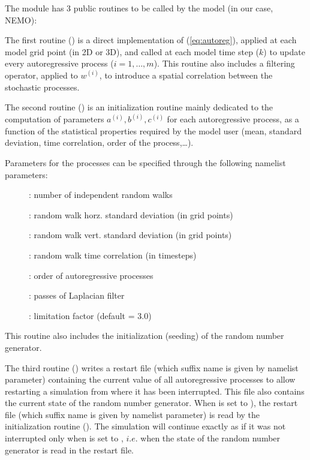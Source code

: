 \documentclass[../tex_main/NEMO_manual]{subfiles}
\begin{document}
The  module has 3 public routines to be called by the model (in our case, NEMO):

The first routine () is a direct implementation of (\autoref{eq:autoreg}),
applied at each model grid point (in 2D or 3D), 
and called at each model time step ($k$) to update
every autoregressive process ($i=1,\ldots,m$).
This routine also includes a filtering operator, applied to $w^{(i)}$,
to introduce a spatial correlation between the stochastic processes.

The second routine () is an initialization routine mainly dedicated
to the computation of parameters $a^{(i)}, b^{(i)}, c^{(i)}$
for each autoregressive process, as a function of the statistical properties
required by the model user (mean, standard deviation, time correlation,
order of the process,\ldots). 

Parameters for the processes can be specified through the following  namelist parameters:
\begin{description}
   \item[]   : number of independent random walks 
   \item[] : random walk horz. standard deviation (in grid points)
   \item[]  : random walk vert. standard deviation (in grid points)
   \item[]  : random walk time correlation (in timesteps)
   \item[]   : order of autoregressive processes
   \item[]   : passes of Laplacian filter
   \item[]   : limitation factor (default = 3.0)
\end{description}
This routine also includes the initialization (seeding) of the random number generator.

The third routine () writes a restart file (which suffix name is 
given by  namelist parameter) containing the current value of 
all autoregressive processes to allow restarting a simulation from where it has been interrupted.
This file also contains the current state of the random number generator.
When  is set to ), the restart file (which suffix name is 
given by  namelist parameter) is read by the initialization routine 
(). The simulation will continue exactly as if it was not interrupted
only  when  is set to , $i.e.$ when the state of 
the random number generator is read in the restart file.
\end{document}
